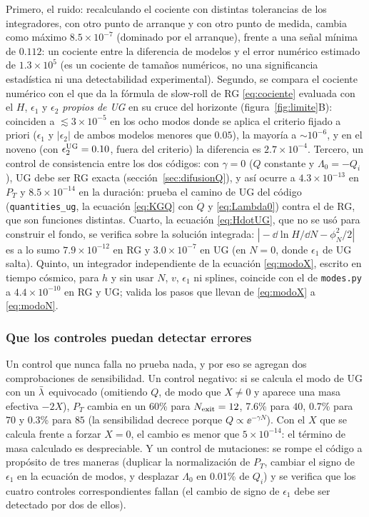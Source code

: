 Primero, el ruido: recalculando el cociente con distintas tolerancias de los integradores, con otro punto de arranque y con otro punto de medida, cambia como máximo $8.5\times10^{-7}$ (dominado por el arranque), frente a una señal mínima de $0.112$: un cociente entre la diferencia de modelos y el error numérico estimado de $1.3\times10^{5}$ (es un cociente de tamaños numéricos, no una significancia estadística ni una detectabilidad experimental). Segundo, se compara el cociente numérico con el que da la fórmula de slow-roll de RG \eqref{eq:cociente} evaluada con el $H$, $\epsilon_1$ y $\epsilon_2$ \emph{propios de UG} en su cruce del horizonte (figura~\ref{fig:limite}B): coinciden a $\lesssim3\times10^{-5}$ en los ocho modos donde se aplica el criterio fijado a priori ($\epsilon_1$ y $|\epsilon_2|$ de ambos modelos menores que $0.05$), la mayoría a $\sim10^{-6}$, y en el noveno (con $\epsilon_2^{\rm UG}=0.10$, fuera del criterio) la diferencia es $2.7\times10^{-4}$. Tercero, un control de consistencia entre los dos códigos: con $\gamma=0$ ($Q$ constante y $\Lambda_0=-Q_i$), UG debe ser RG exacta (sección~\ref{sec:difusionQ}), y así ocurre a $4.3\times10^{-13}$ en $P_T$ y $8.5\times10^{-14}$ en la duración: prueba el camino de UG del código (\texttt{quantities\_ug}, la ecuación \eqref{eq:KGQ} con $\dot Q$ y \eqref{eq:Lambda0}) contra el de RG, que son funciones distintas. Cuarto, la ecuación \eqref{eq:HdotUG}, que no se usó para construir el fondo, se verifica sobre la solución integrada: $|\!-\!\dd\ln H/\dd N-\phi_N^2/2|$ es a lo sumo $7.9\times10^{-12}$ en RG y $3.0\times10^{-7}$ en UG (en $N=0$, donde $\epsilon_1$ de UG salta). Quinto, un integrador independiente de la ecuación \eqref{eq:modoX}, escrito en tiempo cósmico, para $h$ y sin usar $N$, $v$, $\epsilon_1$ ni splines, coincide con el de \texttt{modes.py} a $4.4\times10^{-10}$ en RG y UG; valida los pasos que llevan de \eqref{eq:modoX} a \eqref{eq:modoN}.

\subsubsection{Que los controles puedan detectar errores}

Un control que nunca falla no prueba nada, y por eso se agregan dos comprobaciones de sensibilidad. Un control negativo: si se calcula el modo de UG con un $\bar\lambda$ equivocado (omitiendo $Q$, de modo que $X\neq0$ y aparece una masa efectiva $-2X$), $P_T$ cambia en un 60\% para $N_{\rm exit}=12$, 7.6\% para $40$, 0.7\% para $70$ y 0.3\% para $85$ (la sensibilidad decrece porque $Q\propto\ee^{-\gamma N}$). Con el $X$ que se calcula frente a forzar $X=0$, el cambio es menor que $5\times10^{-14}$: el término de masa calculado es despreciable. Y un control de mutaciones: se rompe el código a propósito de tres maneras (duplicar la normalización de $P_T$, cambiar el signo de $\epsilon_1$ en la ecuación de modos, y desplazar $\Lambda_0$ en 0.01\% de $Q_i$) y se verifica que los cuatro controles correspondientes fallan (el cambio de signo de $\epsilon_1$ debe ser detectado por dos de ellos).

